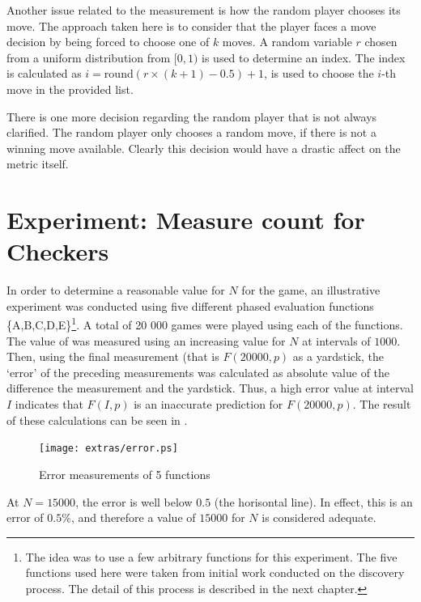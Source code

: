 Another issue related to the measurement is how the random player chooses its move.  The approach taken here is to consider that the player faces a move decision by being forced to choose one of $k$ moves.  A random variable $r$ chosen from a uniform distribution from $[0,1)$ is used to determine an index.  The index is calculated as $i = \mbox{round}(r \times (k+1) - 0.5) + 1$, is used to choose the $i$-th move in the provided list.

There is one more decision regarding the random player that is not always clarified.  The random player only chooses a random move, if there is not a winning move available. Clearly this decision would have a drastic affect on the metric itself. 

\section{Experiment: Measure count for Checkers}
In order to determine a reasonable value for $N$ for the  game, an illustrative experiment was conducted using five different phased evaluation functions \{A,B,C,D,E\}\footnote{The idea was to use a few arbitrary functions for this experiment. The five functions used here were taken from initial work conducted on the discovery process. The detail of this process is described in the next chapter.}. A total of 20 000 games were played using each of the functions. The value of  was measured using an increasing value for $N$ at intervals of  $1000$.  Then, using the final measurement (that is $F(20000,p)$ as a yardstick, the `error' of the preceding measurements was calculated as absolute value of the difference the measurement and the yardstick.  Thus, a high error value at interval $I$ indicates that $F(I,p)$ is an inaccurate prediction for $F(20000,p)$.  The result of these calculations can be seen in .
\begin{figure}[htp]
	\centering
		\texttt{[image: extras/error.ps]}
	\caption{Error measurements of 5 functions}
	\label{fig:error}
\end{figure}
At $N = 15000$, the error is well below $0.5$ (the horisontal line). In effect, this is an error of $0.5\%$, and therefore a value of $15000$ for $N$ is considered adequate.




